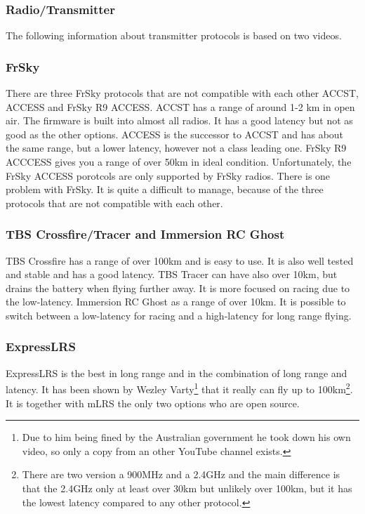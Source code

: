 \documentclass{article}
\begin{document}
	\subsubsection{Radio/Transmitter}
	The following information about transmitter protocols is based on two videos\cite{transprotocols}\cite{mlrs}.
	\subsubsection*{FrSky}
	There are three FrSky protocols that are not compatible with each other ACCST, ACCESS and FrSky R9 ACCESS. ACCST has a range of around 1-2 km in open air. The firmware is built into almost all radios. It has a good latency but not as good as the other options. ACCESS is the successor to ACCST and has about the same range, but a lower latency, however not a class leading one. FrSky R9 ACCCESS gives you a range of over 50km in ideal condition. Unfortunately, the FrSky ACCESS porotcols are only supported by FrSky radios. There is one problem with FrSky. It is quite a difficult to manage, because of the three protocols that are not compatible with each other.

	\subsubsection*{TBS Crossfire/Tracer and Immersion RC Ghost}
	TBS Crossfire has a range of over 100km and is easy to use. It is also well tested and stable and has a good latency. 
	TBS Tracer can have also over 10km, but drains the battery when flying further away. It is more focused on racing due to the low-latency.
	Immersion RC Ghost as a range of over 10km. It is possible to switch between a low-latency for racing and a high-latency for long range flying. 
	\subsubsection*{ExpressLRS}
	ExpressLRS is the best in long range and in the combination of long range and latency. It has been shown by Wezley Varty\cite{elrswezley}\footnote{Due to him being fined by the Australian government he took down his own video, so only a copy from an other YouTube channel exists.} that it really can fly up to 100km\footnote{There are two version a 900MHz and a 2.4GHz and the main difference is that the 2.4GHz only at least over 30km but unlikely over 100km, but it has the lowest latency compared to any other protocol.}. It is together with mLRS the only two options who are open source.
\end{document}

